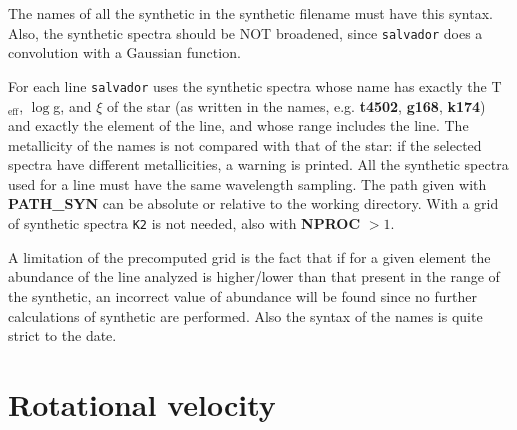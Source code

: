 \documentclass[modern]{aastex701}
\begin{document}
The names of all the synthetic in the synthetic filename must have this syntax. Also, the synthetic spectra should be NOT broadened, since \texttt{salvador} does a convolution with a Gaussian function. 

For each line \texttt{salvador} uses the synthetic spectra whose name has exactly the T$_{\mathrm{eff}}$, $\log$g, and $\xi$ of the star (as written in the names, e.g. {\bf t4502}, {\bf g168}, {\bf k174}) and exactly the element of the line, and whose range includes the line. The metallicity of the names is not compared with that of the star: if the selected spectra have different metallicities, a warning is printed. All the synthetic spectra used for a line must have the same wavelength sampling. The path given with {\bf PATH\_SYN} can be absolute or relative to the working directory. With a grid of synthetic spectra \texttt{K2} is not needed, also with {\bf NPROC} $> 1$.

A limitation of the precomputed grid is the fact that if for a given element the abundance of the line analyzed is higher/lower than that present in the range of the synthetic, an incorrect value of abundance will be found since no further calculations of synthetic are performed. Also the syntax of the names is quite strict to the date.


\section{Rotational velocity} \label{sect:rotation}
\hrulefill
\end{document}
